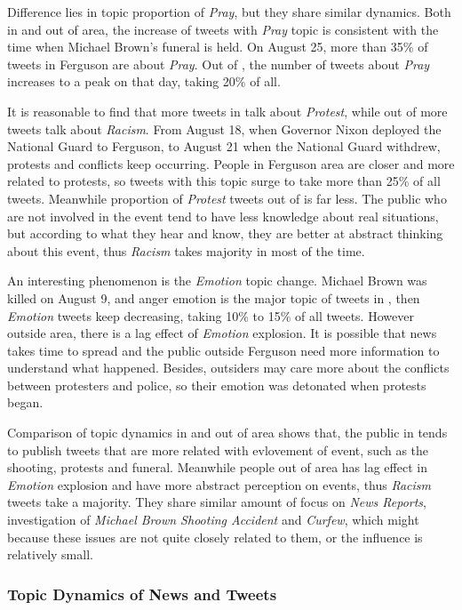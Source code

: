Difference lies in topic proportion of \emph{Pray}, but they share similar dynamics. Both in and out of \stlouis area, the increase of tweets with \emph{Pray} topic is consistent with the time when Michael Brown's funeral is held. On August 25, more than 35\% of tweets in Ferguson are about \emph{Pray}. Out of \stlouis, the number of tweets about \emph{Pray} increases to a peak on that day, taking 20\% of all.

It is reasonable to find that more tweets in \stlouis talk about \emph{Protest}, while out of \stlouis more tweets talk about \emph{Racism}. From August 18, when Governor Nixon deployed the National Guard to Ferguson, to August 21 when the National Guard withdrew, protests and conflicts keep occurring. People in Ferguson area are closer and more related to protests, so tweets with this topic surge to take more than 25\% of all tweets. Meanwhile proportion of \emph{Protest} tweets out of \stlouis is far less. The public who are not involved in the event tend to have less knowledge about real situations, but according to what they hear and know, they are better at abstract thinking about this event, thus \emph{Racism} takes majority in most of the time.

An interesting phenomenon is the \emph{Emotion} topic change. Michael Brown was killed on August 9, and anger emotion is the major topic of tweets in \stlouis, then \emph{Emotion} tweets keep decreasing, taking 10\% to 15\% of all tweets. However outside \stlouis area, there is a lag effect of \emph{Emotion} explosion. It is possible that news takes time to spread and the public outside Ferguson need more information to understand what happened. Besides, outsiders may care more about the conflicts between protesters and police, so their emotion was detonated when protests began.

Comparison of topic dynamics in and out of \stlouis area shows that, the public in \stlouis tends to publish tweets that are more related with evlovement of event, such as the shooting, protests and funeral. Meanwhile people out of \stlouis area has lag effect in \emph{Emotion} explosion and have more abstract perception on events, thus \emph{Racism} tweets take a majority. They share similar amount of focus on \emph{News Reports}, investigation of \emph{Michael Brown Shooting Accident} and \emph{Curfew}, which might because these issues are not quite closely related to them, or the influence is relatively small.

\subsubsection{Topic Dynamics of News and Tweets}

